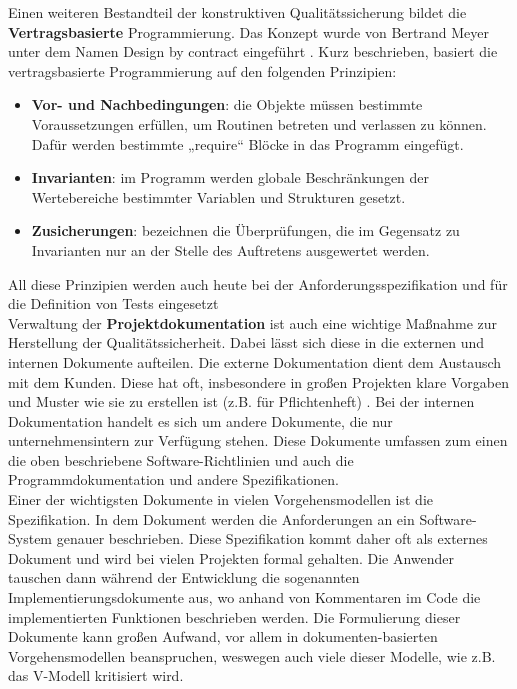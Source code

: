 Einen weiteren Bestandteil der konstruktiven Qualitätssicherung bildet die \textbf{Vertragsbasierte} Programmierung. Das Konzept wurde von Bertrand Meyer unter dem Namen Design by contract eingeführt \cite{Meye:1992:Applying:1}. 
Kurz beschrieben, basiert die vertragsbasierte Programmierung auf den folgenden Prinzipien:
\begin{itemize}
    \item \textbf{Vor- und Nachbedingungen}: die Objekte müssen bestimmte Voraussetzungen erfüllen, um Routinen betreten und verlassen zu können. Dafür werden bestimmte „require“ Blöcke in das Programm eingefügt.
    \item \textbf{Invarianten}: im Programm werden globale Beschränkungen der Wertebereiche bestimmter Variablen und Strukturen gesetzt.
    \item \textbf{Zusicherungen}: bezeichnen die Überprüfungen, die im Gegensatz zu Invarianten nur an der Stelle des Auftretens ausgewertet werden.
\end{itemize}  
All diese Prinzipien werden auch heute bei der Anforderungsspezifikation und für die Definition von Tests eingesetzt \cite[96]{Hoff:2008:Software:} \cite{Meye:1992:Applying:1}
\\

Verwaltung der \textbf{Projektdokumentation} ist auch eine wichtige Maßnahme zur Herstellung der Qualitätssicherheit. Dabei lässt sich diese in die externen und internen Dokumente aufteilen. 
Die externe Dokumentation dient dem Austausch mit dem Kunden. Diese hat oft, insbesondere in großen Projekten klare Vorgaben und Muster wie sie zu erstellen ist (z.B. für Pflichtenheft) \cite[141]{Hoff:2008:Software:}. 
Bei der internen Dokumentation handelt es sich um andere Dokumente, die nur unternehmensintern zur Verfügung stehen. Diese Dokumente umfassen zum einen die oben beschriebene Software-Richtlinien und auch die Programmdokumentation und andere Spezifikationen. 
\\Einer der wichtigsten Dokumente in vielen Vorgehensmodellen ist die Spezifikation. In dem Dokument werden die Anforderungen an ein Software-System genauer beschrieben. 
Diese Spezifikation kommt daher oft als externes Dokument und wird bei vielen Projekten formal gehalten. Die Anwender tauschen dann während der Entwicklung die sogenannten Implementierungsdokumente aus, wo anhand von Kommentaren im Code die implementierten Funktionen beschrieben werden. 
Die Formulierung dieser Dokumente kann großen Aufwand, vor allem in dokumenten-basierten Vorgehensmodellen beanspruchen, weswegen auch viele dieser Modelle, wie z.B. das V-Modell kritisiert wird. \cite{IJC:2015:Related:} 
